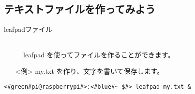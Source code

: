 \subsection{テキストファイルを作ってみよう}
\begin{description}
\item[leafpad\textvisiblespace ファイル]\mbox{}\\
leafpad を使ってファイルを作ることができます。
\end{description}
\begin{itemize}
\item[<例>]my.txt を作り、文字を書いて保存します。
\end{itemize}
\begin{lstlisting}[caption=leafpadの例, label=leafpad]
<#green#pi@raspberrypi#>:<#blue#~ $#> leafpad my.txt &
\end{lstlisting}
\begin{tcolorbox}[title=\useOmetoi]
\begin{enumerate}
\end{enumerate}
\end{tcolorbox}
